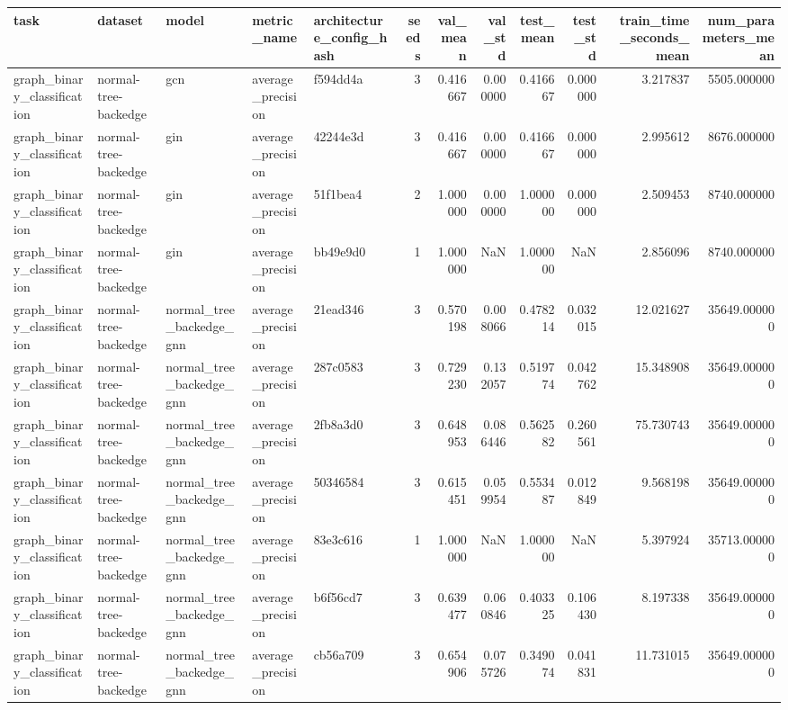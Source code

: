 \begin{tabular}{lllllrrrrrrr}
\toprule
task & dataset & model & metric_name & architecture_config_hash & seeds & val_mean & val_std & test_mean & test_std & train_time_seconds_mean & num_parameters_mean \\
\midrule
graph_binary_classification & normal-tree-backedge & gcn & average_precision & f594dd4a & 3 & 0.416667 & 0.000000 & 0.416667 & 0.000000 & 3.217837 & 5505.000000 \\
graph_binary_classification & normal-tree-backedge & gin & average_precision & 42244e3d & 3 & 0.416667 & 0.000000 & 0.416667 & 0.000000 & 2.995612 & 8676.000000 \\
graph_binary_classification & normal-tree-backedge & gin & average_precision & 51f1bea4 & 2 & 1.000000 & 0.000000 & 1.000000 & 0.000000 & 2.509453 & 8740.000000 \\
graph_binary_classification & normal-tree-backedge & gin & average_precision & bb49e9d0 & 1 & 1.000000 & NaN & 1.000000 & NaN & 2.856096 & 8740.000000 \\
graph_binary_classification & normal-tree-backedge & normal_tree_backedge_gnn & average_precision & 21ead346 & 3 & 0.570198 & 0.008066 & 0.478214 & 0.032015 & 12.021627 & 35649.000000 \\
graph_binary_classification & normal-tree-backedge & normal_tree_backedge_gnn & average_precision & 287c0583 & 3 & 0.729230 & 0.132057 & 0.519774 & 0.042762 & 15.348908 & 35649.000000 \\
graph_binary_classification & normal-tree-backedge & normal_tree_backedge_gnn & average_precision & 2fb8a3d0 & 3 & 0.648953 & 0.086446 & 0.562582 & 0.260561 & 75.730743 & 35649.000000 \\
graph_binary_classification & normal-tree-backedge & normal_tree_backedge_gnn & average_precision & 50346584 & 3 & 0.615451 & 0.059954 & 0.553487 & 0.012849 & 9.568198 & 35649.000000 \\
graph_binary_classification & normal-tree-backedge & normal_tree_backedge_gnn & average_precision & 83e3c616 & 1 & 1.000000 & NaN & 1.000000 & NaN & 5.397924 & 35713.000000 \\
graph_binary_classification & normal-tree-backedge & normal_tree_backedge_gnn & average_precision & b6f56cd7 & 3 & 0.639477 & 0.060846 & 0.403325 & 0.106430 & 8.197338 & 35649.000000 \\
graph_binary_classification & normal-tree-backedge & normal_tree_backedge_gnn & average_precision & cb56a709 & 3 & 0.654906 & 0.075726 & 0.349074 & 0.041831 & 11.731015 & 35649.000000 \\

\end{tabular}
